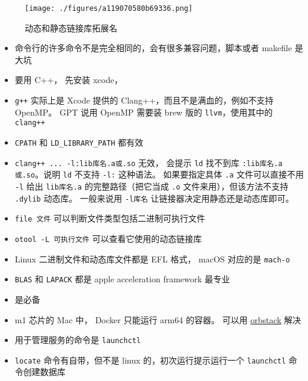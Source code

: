 
\begin{issues}
\issueDraft
\end{issues}

\begin{figure}[ht]
\centering
\texttt{[image: ./figures/a119070580b69336.png]}
\caption{动态和静态链接库拓展名} \label{fig_MacDev_1}
\end{figure}

\begin{itemize}
\item 命令行的许多命令不是完全相同的，会有很多兼容问题，脚本或者 makefile 是大坑
\item 要用 C++， 先安装 xcode， \item \verb`g++` 实际上是 Xcode 提供的 Clang++，而且不是满血的，例如不支持 OpenMP。 GPT 说用 OpenMP 需要装 brew 版的 \verb`llvm`，使用其中的 \verb`clang++`
\item \verb`CPATH` 和 \verb`LD_LIBRARY_PATH` 都有效
\item \verb`clang++ ... -l:lib库名.a或.so` 无效， 会提示 \verb`ld` 找不到库 \verb`:lib库名.a或.so`。说明 \verb`ld` 不支持 \verb`-l:` 这种语法。 如果要指定具体 \verb`.a` 文件可以直接不用 \verb`-l` 给出 \verb`lib库名.a` 的完整路径（把它当成 \verb`.o` 文件来用），但该方法不支持 \verb`.dylib` 动态库。 一般来说用 \verb`-l库名` 让链接器决定用静态还是动态库即可。
\item \verb`file 文件` 可以判断文件类型包括二进制可执行文件
\item \verb`otool -L 可执行文件` 可以查看它使用的动态链接库
\item Linux 二进制文件和动态库文件都是 EFL 格式， macOS 对应的是 \verb`mach-o`
\item \verb`BLAS` 和 \verb`LAPACK` 都是 apple acceleration framework 最专业
\item {} 是必备
\item m1 芯片的 Mac 中， Docker 只能运行 arm64 的容器。 可以用 \href{https://orbstack.dev/}{orbstack} 解决
\item 用于管理服务的命令是 \verb`launchctl`
\item \verb`locate` 命令有自带，但不是 linux 的，初次运行提示运行一个 \verb`launchctl` 命令创建数据库
\end{itemize}
